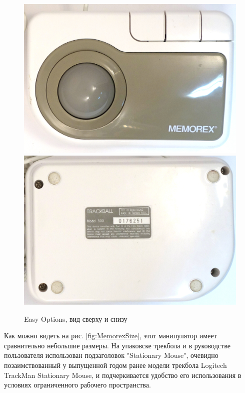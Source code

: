 \documentclass[11pt, a4paper]{article}
\begin{document}
\begin{figure}[h]
    \centering
    \includegraphics[scale=0.45]{1994_memorex_trackball/top_30.jpg}
    \includegraphics[scale=0.45]{1994_memorex_trackball/bottom_30.jpg}
    \caption{Easy Options, вид сверху и снизу}
    \label{fig:MemorexTopBottom}
\end{figure}

Как можно видеть на рис. \ref{fig:MemorexSize}, этот манипулятор имеет сравнительно небольшие размеры.
На упаковске трекбола и в руководстве пользователя использован подзаголовок "Stationary Mouse", очевидно позаимствованный у выпущенной годом ранее модели трекбола Logitech TrackMan Stationary Mouse, и подчеркивается удобство его использования в условиях ограниченного рабочего пространства.
\end{document}
